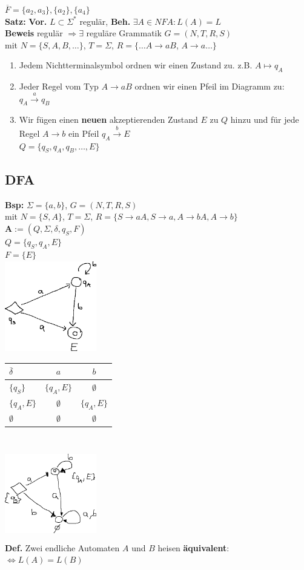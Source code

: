 \documentclass[a4paper,10pt,landscape,twocolumn]{article}
\newcommand{\Bold}[1]{\textbf{#1}} %
\newcommand{\Oben}[2]{\overset{#1}{#2}} %
\begin{document}
$\overline{F}=\{a_2,a_3\},\{a_2\},\{a_4\}$\\
\Bold{Satz:} \Bold{Vor.} $L\subset \Sigma^*$ regul\"ar, \Bold{Beh.} $\exists A\in NFA:L(A)=L$\\
\Bold{Beweis} regul\"ar $\Rightarrow\exists$ regul\"are Grammatik $G=(N,T,R,S)$\\
mit $N=\{S,A,B,\dots\}$, $T=\Sigma$, $R=\{\dots A\to aB$, $A\to a\dots\}$
\begin{enumerate}
 \item Jedem Nichtterminalsymbol ordnen wir einen Zustand zu. z.B. $A\mapsto q_A$
 \item Jeder Regel vom Typ $A\to aB$ ordnen wir einen Pfeil im Diagramm zu: $q_A\Oben{a}{\to}q_B$
 \item Wir f\"ugen einen \Bold{neuen} akzeptierenden Zustand $E$ zu $Q$ hinzu und f\"ur jede Regel $A\to b$ ein Pfeil $q_A\Oben{b}{\to}E$\\
 $Q=\{q_S,q_A,q_B,\dots,E\}$
\end{enumerate}
\subsection{DFA}
\Bold{Bsp:} $\Sigma=\{a,b\}$, $G=(N,T,R,S)$\\
mit $N=\{S,A\}$, $T=\Sigma$, $R=\{S\to aA,S\to a,A\to bA, A\to b\}$\\
$\Bold{A}:=(Q,\Sigma,\delta,q_S,F)$\\
$Q=\{q_S,q_A,E\}$\\
$F=\{E\}$\\
\includegraphics[width=0.3\textwidth,height=4cm,keepaspectratio]{Bild7.eps}\\
\begin{tabular}{l|c|c}
 $\overline{\delta}$&$a$&$b$\\\hline
 $\{q_S\}$&$\{q_A,E\}$&$\emptyset$\\
 $\{q_A,E\}$&$\emptyset$&$\{q_A,E\}$\\
 $\emptyset$&$\emptyset$&$\emptyset$\\
\end{tabular}\\
\includegraphics[width=0.3\textwidth,height=4cm,keepaspectratio]{Bild8.eps}\\
\Bold{Def.} Zwei endliche Automaten $A$ und $B$ heisen \Bold{\"aquivalent}: $\Leftrightarrow L(A)=L(B)$
\end{document}
